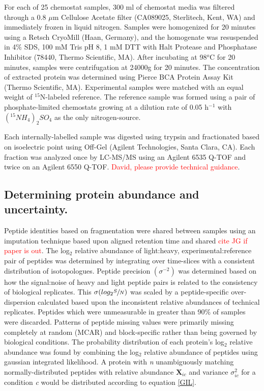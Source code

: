 \documentclass[12pt]{nature}\usepackage{graphicx, color}
\begin{document}
For each of 25 chemostat samples, 300 ml of chemostat media was filtered through a 0.8 $\mu$m Cellulose Acetate filter (CA089025, Sterlitech, Kent, WA) and immediately frozen in liquid nitrogen.  Samples were homogenized for 20 minutes using a Retsch CryoMill (Haan, Germany), and the homogenate was resuspended in 4\% SDS, 100 mM Tris pH 8, 1 mM DTT with Halt Protease and Phosphatase Inhibitor (78440, Thermo Scientific, MA).  After incubating at 98$^{o}$C for 20 minutes, samples were centrifugation at 24000g for 20 minutes.  The concentration of extracted protein was determined using Pierce BCA Protein Assay Kit (Thermo Scientific, MA).  Experimental samples were matched with an equal weight of $^{15}$N-labeled reference.  The reference sample was formed using a pair of phosphate-limited chemostats growing at a dilution rate of 0.05 h$^{-1}$ with $(^{15}NH_{4})_{2}SO_{4}$ as the only nitrogen-source.

Each internally-labelled sample was digested using trypsin and fractionated based on isoelectric point using Off-Gel (Agilent Technologies, Santa Clara, CA). Each fraction was analyzed once by LC-MS/MS using an Agilent 6535 Q-TOF and twice on an Agilent 6550 Q-TOF.  \textcolor{red}{David, please provide technical guidance}.

\subsection{Determining protein abundance and uncertainty.}

Peptide identities based on fragmentation were shared between samples using an imputation technique based upon aligned retention time and shared  \textcolor{red}{cite JG if paper is out}. The log$_{2}$ relative abundance of light:heavy, experimental:reference pair of peptides was determined by integrating over time-slices with a consistent distribution of isotopologues. Peptide precision $\left(\sigma^{-2}\right)$ was determined based on how the signal:noise of heavy and light peptide pairs is related to the consistency of biological replicates.  This $\sigma(log_{2}\sfrac{S}{N})$ was scaled by a peptide-specific over-dispersion calculated based upon the inconsistent relative abundances of technical replicates.  Peptides which were unmeasurable in greater than 90\% of samples were discarded.  Patterns of peptide missing values were primarily missing completely at random (MCAR) and block-specific rather than being governed by biological conditions.  The probability distribution of each protein's log$_{2}$ relative abundance was found by combining the log$_{2}$ relative abundance of peptides using gaussian integrated likelihood.  A protein with \textit{n} unambiguously matching normally-distributed peptides with relative abundance $\textbf{X}_{ic}$ and variance $\sigma^{2}_{ic}$ for a condition \textit{c} would be distributed according to equation \ref{GIL}.
\end{document}
